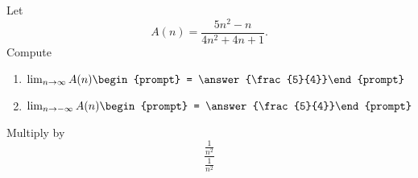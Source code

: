 \documentclass{ximera}
\author{Bart Snapp}
\begin{document}
\begin{exercise}
Let 
\[
A(n) = \frac{5 n^2-n}{4 n^2+4 n+1}.
\]
Compute
\begin{enumerate}
\item $\lim_{n\to \infty} A(n) \begin{prompt} = \answer{\frac{5}{4}}\end{prompt}$
\item $\lim_{n\to -\infty}A(n) \begin{prompt} = \answer{\frac{5}{4}}\end{prompt}$
\end{enumerate}
\begin{hint}
Multiply by
\[
\frac{\frac{1}{n^2}}{\frac{1}{n^2}}
\]
\end{hint}
\end{exercise}
\end{document}
